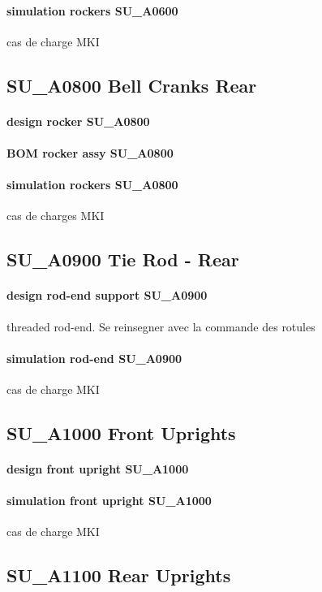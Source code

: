 		\paragraph{simulation rockers SU\_A0600} cas de charge MKI
	\subsection*{SU\_A0800 Bell Cranks Rear} 
 \par 
		\paragraph{design rocker SU\_A0800} 
		\paragraph{BOM rocker assy SU\_A0800} 
		\paragraph{simulation rockers SU\_A0800} cas de charges MKI
	\subsection*{SU\_A0900 Tie Rod - Rear} 
 \par 
		\paragraph{design rod-end support SU\_A0900} threaded rod-end. Se reinsegner avec la commande des rotules
		\paragraph{simulation rod-end SU\_A0900} cas de charge MKI

	\subsection*{SU\_A1000 Front Uprights} 
 \par 
		\paragraph{design front upright SU\_A1000} 
		\paragraph{simulation front upright SU\_A1000} cas de charge MKI
	\subsection*{SU\_A1100 Rear Uprights} 
 \par 
